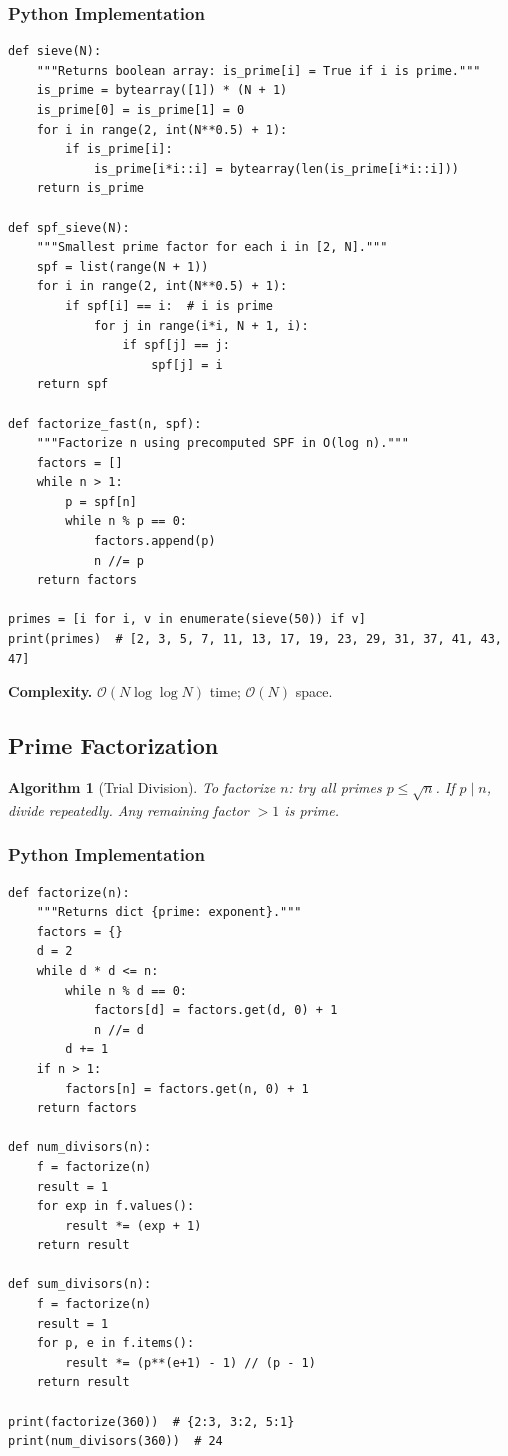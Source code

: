 \documentclass[10pt,a4paper]{article}
\theoremstyle{cpstyle}
\newtheorem{algorithm}[theorem]{Algorithm}
\newcommand{\bigO}[1]{\mathcal{O}\!\left(#1\right)}
\begin{document}
\subsubsection{Python Implementation}
\begin{lstlisting}[caption={Sieve of Eratosthenes + Smallest Prime Factor sieve}]
def sieve(N):
    """Returns boolean array: is_prime[i] = True if i is prime."""
    is_prime = bytearray([1]) * (N + 1)
    is_prime[0] = is_prime[1] = 0
    for i in range(2, int(N**0.5) + 1):
        if is_prime[i]:
            is_prime[i*i::i] = bytearray(len(is_prime[i*i::i]))
    return is_prime

def spf_sieve(N):
    """Smallest prime factor for each i in [2, N]."""
    spf = list(range(N + 1))
    for i in range(2, int(N**0.5) + 1):
        if spf[i] == i:  # i is prime
            for j in range(i*i, N + 1, i):
                if spf[j] == j:
                    spf[j] = i
    return spf

def factorize_fast(n, spf):
    """Factorize n using precomputed SPF in O(log n)."""
    factors = []
    while n > 1:
        p = spf[n]
        while n % p == 0:
            factors.append(p)
            n //= p
    return factors

primes = [i for i, v in enumerate(sieve(50)) if v]
print(primes)  # [2, 3, 5, 7, 11, 13, 17, 19, 23, 29, 31, 37, 41, 43, 47]
\end{lstlisting}

\textbf{Complexity.} $\bigO{N \log \log N}$ time; $\bigO{N}$ space.

\subsection{Prime Factorization}

\begin{algorithm}[Trial Division]
To factorize $n$: try all primes $p \leq \sqrt{n}$. If $p \mid n$, divide repeatedly. Any remaining factor $> 1$ is prime.
\end{algorithm}

\subsubsection{Python Implementation}
\begin{lstlisting}[caption={Prime Factorization by Trial Division}]
def factorize(n):
    """Returns dict {prime: exponent}."""
    factors = {}
    d = 2
    while d * d <= n:
        while n % d == 0:
            factors[d] = factors.get(d, 0) + 1
            n //= d
        d += 1
    if n > 1:
        factors[n] = factors.get(n, 0) + 1
    return factors

def num_divisors(n):
    f = factorize(n)
    result = 1
    for exp in f.values():
        result *= (exp + 1)
    return result

def sum_divisors(n):
    f = factorize(n)
    result = 1
    for p, e in f.items():
        result *= (p**(e+1) - 1) // (p - 1)
    return result

print(factorize(360))  # {2:3, 3:2, 5:1}
print(num_divisors(360))  # 24
\end{lstlisting}
\end{document}
